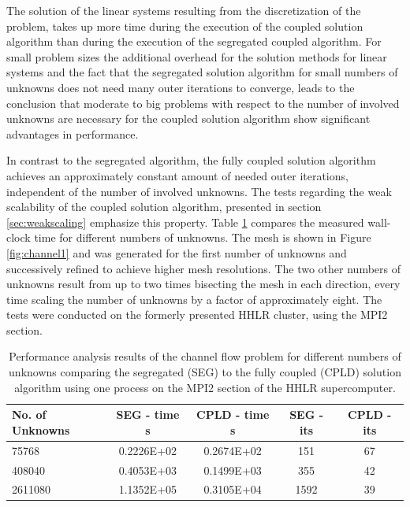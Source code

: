 The solution of the linear systems resulting from the discretization of the problem, takes up more time during the execution of the coupled solution algorithm than during the execution of the segregated coupled algorithm. For small problem sizes the additional overhead for the solution methods for linear systems and the fact that the segregated solution algorithm for small numbers of unknowns does not need many outer iterations to converge, leads to the conclusion that moderate to big problems with respect to the number of involved unknowns are necessary for the coupled solution algorithm show significant advantages in performance. 

In contrast to the segregated algorithm, the fully coupled solution algorithm achieves an approximately constant amount of needed outer iterations, independent of the number of involved unknowns. The tests regarding the weak scalability of the coupled solution algorithm, presented in section \ref{sec:weakscaling} emphasize this property. Table \ref{tab:channelcompare} compares the measured wall-clock time for different numbers of unknowns. The mesh is shown in Figure \ref{fig:channel1} and was generated for the first number of unknowns and successively refined to achieve higher mesh resolutions. The two other numbers of unknowns result from up to two times bisecting the mesh in each direction, every time scaling the number of unknowns by a factor of approximately eight. The tests were conducted on the formerly presented HHLR cluster, using the MPI2 section. 

\begin{table}[h!]\centering
  \caption{Performance analysis results of the channel flow problem for different numbers of unknowns comparing the segregated (SEG) to the fully coupled (CPLD) solution algorithm using one process on the MPI2 section of the HHLR supercomputer. }
  \begin{tabular}{lcccc}\toprule
    No. of Unknowns & SEG - time s & CPLD - time s & SEG - its & CPLD - its \\
    \midrule
    \rowcolor{black!20} 75768    & 0.2226E+02 & 0.2674E+02 & 151  & 67 \\
    \rowcolor{black!00} 408040   & 0.4053E+03 & 0.1499E+03 & 355  & 42 \\
    \rowcolor{black!20} 2611080  & 1.1352E+05 & 0.3105E+04 & 1592 & 39 \\
  \end{tabular}
  \label{tab:channelcompare}
\end{table}


